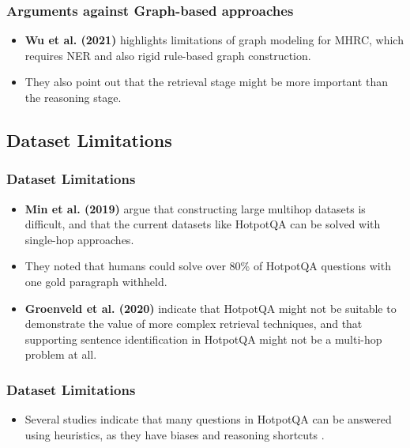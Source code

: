 \documentclass[10pt]{beamer}
\begin{document}
\begin{frame}
  \frametitle{Arguments against Graph-based approaches}
  \begin{itemize}
    \item \textbf{Wu et al. (2021)} \cite{RN106} highlights limitations of graph modeling for MHRC, which requires NER and also rigid rule-based graph construction.
    \item They also point out that the retrieval stage might be more important than the reasoning stage.
  \end{itemize}

\end{frame}

\subsection{Dataset Limitations}

\begin{frame}
  \frametitle{Dataset Limitations}
  \begin{itemize}
    \item \textbf{Min et al. (2019)} \cite{RN150} argue that constructing large multihop datasets is difficult, and that the current datasets like HotpotQA can be solved with single-hop approaches.
    \item They noted that humans could solve over 80\% of HotpotQA questions with one gold paragraph withheld.
    \item \textbf{Groenveld et al. (2020)} \cite{RN126} indicate that HotpotQA might not be suitable to demonstrate the value of more complex retrieval techniques, and that supporting sentence identification in HotpotQA might not be a multi-hop problem at all.
  \end{itemize}
  
\end{frame}

\begin{frame}
  \frametitle{Dataset Limitations}
  \begin{itemize}
    \item Several studies \cite{RN154} \cite{RN176} \cite{RN150} \cite{RN175} indicate that many questions in HotpotQA can be answered using heuristics, 
    as they have biases and reasoning shortcuts \cite{RN177}.
  \end{itemize}
  
\end{frame}

\end{document}
